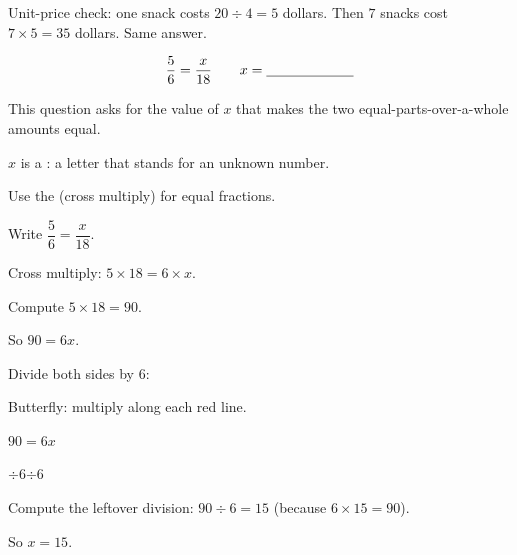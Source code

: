 
\noindent Unit-price check: one snack costs $20 \div 4 = 5$ dollars. Then $7$
snacks cost $7 \times 5 = 35$ dollars. Same answer.


\[ \frac{5}{6} = \frac{x}{18} \qquad x = \underline{\hspace{2.2cm}} \]


\noindent This question asks for the value of $x$ that makes the two
equal-parts-over-a-whole amounts equal.

\begin{words}
  \item $x$ is a : a letter that stands for an unknown number.
  \item Use the (cross multiply) for equal fractions.
\end{words}

\begin{steps}
  \item Write $\dfrac{5}{6} = \dfrac{x}{18}$.
  \item Cross multiply: $5 \times 18 = 6 \times x$.
  \item Compute $5 \times 18 = 90$.
  \item So $90 = 6x$.
  \item Divide both sides by $6$:
    \begin{center}
      \par\smallskip
      Butterfly: multiply along each red line.
      \par\medskip
      $90 = 6x$
      \par\smallskip
      \underline{\textcolor{blue!60!black}{$\div 6$\qquad$\div 6$}}
    \end{center}
  \item Compute the leftover division: $90 \div 6 = 15$ (because
        $6 \times 15 = 90$).
  \item So $x = 15$.
\end{steps}

